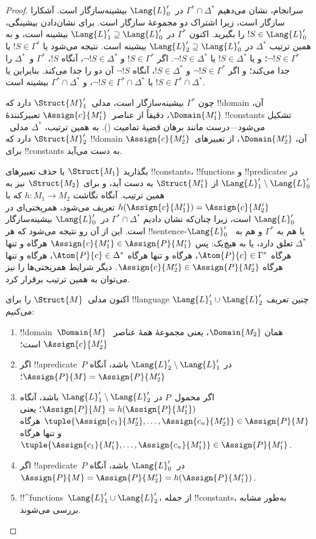 \documentclass[../../../include/open-logic-section]{subfiles}
\begin{document}
\begin{proof}
سرانجام، نشان می‌دهیم $\Gamma^* \cap \Delta^*$ در~$\Lang{L}'_0$
بیشینه‌سازگار است. آشکارا سازگار است، زیرا اشتراک دو مجموعهٔ سازگار
است. برای نشان‌دادن بیشینگی، $!S \in \Lang{L}'_0$ را بگیرید. اکنون
$\Gamma^*$ در $\Lang{L}'_1 \supseteq \Lang{L}'_0$ بیشینه است، و به
همین ترتیب $\Delta^*$ در
$\Lang{L}'_2 \supseteq \Lang{L}'_0$ بیشینه است. نتیجه می‌شود یا
$!S \in \Gamma^*$ یا $\lnot !S \in \Gamma^*$؛ و یا
$!S \in \Delta^*$ یا $\lnot !S \in \Delta^*$. اگر
$!S \in \Gamma^*$ و $\lnot !S \in \Delta^*$، آنگاه $!S$،
$\Gamma^*$ و~$\Delta^*$ را جدا می‌کند؛ و اگر
$\lnot !S \in \Gamma^*$ و $!S \in \Delta^*$، آنگاه $\lnot !S$ آن
دو را جدا می‌کند. بنابراین یا $!S \in \Gamma^* \cap \Delta^*$ یا
$\lnot !S \in \Gamma^* \cap \Delta^*$، و
$\Gamma^* \cap \Delta^*$ بیشینه است.

چون $\Gamma^*$ بیشینه‌سازگار است، مدلی~$\Struct{M}'_1$ دارد که
!!{domain} آن، $\Domain{M'_1}$، دقیقاً از عناصر~$\Assign{c}{M'_1}$
تعبیرکنندهٔ !!{constant}s تشکیل می‌شود---درست مانند برهان قضیهٔ
تمامیت (). به همین ترتیب،
$\Delta^*$ مدلی~$\Struct{M}'_2$ دارد که !!{domain} آن،
$\Domain{M'_2}$، از تعبیرهای~$\Assign{c}{M'_2}$ برای !!{constant}s
به دست می‌آید.

بگذارید $\Struct{M_1}$ با حذف تعبیرهای !!{constant}s، !!{function}s و
!!{predicate}s در $\Lang{L}'_1 \setminus \Lang{L}'_0$ از
$\Struct{M'_1}$ به دست آید، و برای $\Struct{M_2}$ نیز به همین ترتیب.
آنگاه نگاشت $h \colon M_1 \to M_2$ که با
$h(\Assign{c}{M'_1}) = \Assign{c}{M'_2}$ تعریف می‌شود، همریختی‌ای در
$\Lang{L}'_0$ است، زیرا چنان‌که نشان دادیم
$\Gamma^* \cap \Delta^*$ در~$\Lang{L}'_0$ بیشینه‌سازگار است. این از
آن رو نتیجه می‌شود که هر !!{sentence}-$\Lang{L}'_0$ یا هم به
$\Gamma^*$ و هم به~$\Delta^*$ تعلق دارد، یا به هیچ‌یک: پس
$\Assign{c}{M'_1} \in \Assign{P}{M'_1}$ هرگاه و تنها هرگاه
$\Atom{P}{c} \in \Gamma^*$، هرگاه و تنها هرگاه
$\Atom{P}{c} \in \Delta^*$، هرگاه و تنها هرگاه
$\Assign{c}{M'_2} \in \Assign{P}{M'_2}$. دیگر شرایط همریختی‌ها را
نیز می‌توان به همین ترتیب برقرار کرد.

اکنون مدلی~$\Struct{M}$ را برای !!{language}
$\Lang{L}'_1 \cup \Lang{L}'_2$ چنین تعریف می‌کنیم:
\begin{enumerate}
\item !!{domain}~$\Domain{M}$ همان $\Domain{M_2}$، یعنی مجموعهٔ همهٔ
  عناصر~$\Assign{c}{M'_2}$ است؛
\item اگر !!a{predicate}~$P$ در
  $\Lang{L}'_2 \setminus \Lang{L}'_1$ باشد، آنگاه
  $\Assign{P}{M} = \Assign{P}{M'_2}$؛
\item اگر محمول~$P$ در $\Lang{L}'_1\setminus \Lang{L}'_2$ باشد، آنگاه
  $\Assign{P}{M} = h(\Assign{P}{M'_1})$؛ یعنی
  $\tuple{\Assign{c_1}{M'_2}, \dots, \Assign{c_n}{M'_2}} \in
  \Assign{P}{M}$ هرگاه و تنها هرگاه
  $\tuple{\Assign{c_1}{M'_1}, \dots, \Assign{c_n}{M'_1}} \in
  \Assign{P}{M'_1}$.
\item اگر !!a{predicate}~$P$ در~$\Lang{L}'_0$ باشد، آنگاه
  $\Assign{P}{M} = \Assign{P}{M'_2} = h(\Assign{P}{M'_1})$.
\item !!^{function}s~$\Lang{L}'_1 \cup \Lang{L}'_2$، از جمله
  !!{constant}s، به‌طور مشابه بررسی می‌شوند.
\end{enumerate}


\end{proof}
\end{document}
